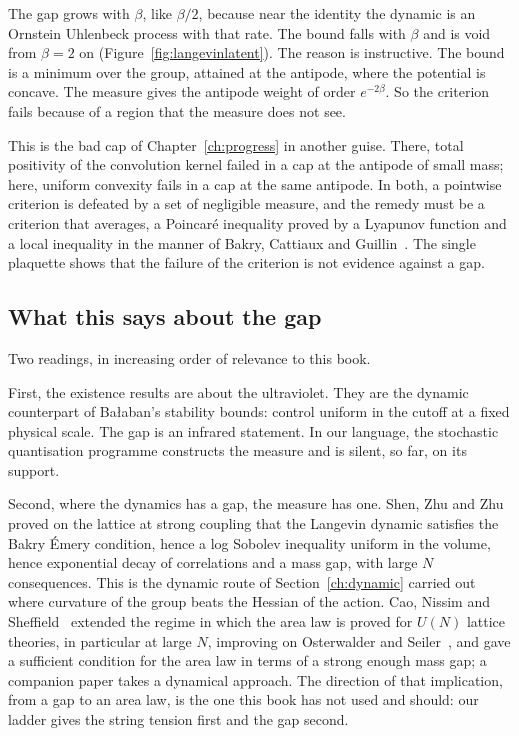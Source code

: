 The gap grows with $\beta$, like $\beta/2$, because near the identity the dynamic is an Ornstein Uhlenbeck process with that rate. The bound falls with $\beta$ and is void from $\beta=2$ on (Figure~\ref{fig:langevinlatent}). The reason is instructive. The bound is a minimum over the group, attained at the antipode, where the potential is concave. The measure gives the antipode weight of order $e^{-2\beta}$. So the criterion fails because of a region that the measure does not see.

This is the bad cap of Chapter~\ref{ch:progress} in another guise. There, total positivity of the convolution kernel failed in a cap at the antipode of small mass; here, uniform convexity fails in a cap at the same antipode. In both, a pointwise criterion is defeated by a set of negligible measure, and the remedy must be a criterion that averages, a Poincar\'e inequality proved by a Lyapunov function and a local inequality in the manner of Bakry, Cattiaux and Guillin~\cite{BCG08}. The single plaquette shows that the failure of the criterion is not evidence against a gap.

\subsection{What this says about the gap}

Two readings, in increasing order of relevance to this book.

First, the existence results are about the ultraviolet. They are the dynamic counterpart of Ba\l aban's stability bounds: control uniform in the cutoff at a fixed physical scale. The gap is an infrared statement. In our language, the stochastic quantisation programme constructs the measure and is silent, so far, on its support.

Second, where the dynamics has a gap, the measure has one. Shen, Zhu and Zhu~\cite{SZZ} proved on the lattice at strong coupling that the Langevin dynamic satisfies the Bakry \'Emery condition, hence a log Sobolev inequality uniform in the volume, hence exponential decay of correlations and a mass gap, with large $N$ consequences. This is the dynamic route of Section~\ref{ch:dynamic} carried out where curvature of the group beats the Hessian of the action. Cao, Nissim and Sheffield~\cite{CNS25} extended the regime in which the area law is proved for $U(N)$ lattice theories, in particular at large $N$, improving on Osterwalder and Seiler~\cite{OSe}, and gave a sufficient condition for the area law in terms of a strong enough mass gap; a companion paper takes a dynamical approach. The direction of that implication, from a gap to an area law, is the one this book has not used and should: our ladder gives the string tension first and the gap second.

